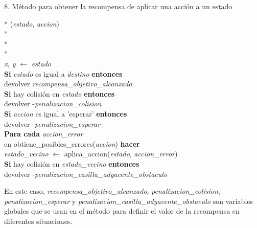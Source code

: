 \documentclass[conference,a4paper]{IEEEtran}
\begin{document}
8. Método para obtener la recompensa de aplicar una acción a un estado
  \begin{pseudo}*
    (\textit{estado}, \textit{accion}) \\*
     \\*
     \\*
     \\
    \textit{x, y} $\leftarrow$ \textit{estado} \\
    \textbf{Si} \textit{estado} es igual a \textit{destino} \textbf{entonces} \\
    \> devolver \textit{recompensa\_objetivo\_alcanzado} \\
    \textbf{Si} hay colisión en \textit{estado} \textbf{entonces} \\
    \> devolver -\textit{penalizacion\_colision} \\
    \textbf{Si} \textit{accion} es igual a 'esperar' \textbf{entonces} \\
    \> devolver -\textit{penalizacion\_esperar} \\
    \textbf{Para cada} \textit{accion\_error} \\ en obtiene\_posibles\_errores(\textit{accion}) \textbf{hacer} \\
    \> \textit{estado\_vecino} $\leftarrow$ aplica\_accion(\textit{estado}, \textit{accion\_error}) \\
    \> \textbf{Si} hay colisión en \textit{estado\_vecino} \textbf{entonces} \\
    \> \> devolver -\textit{penalizacion\_casilla\_adyacente\_obstaculo} \\
  \end{pseudo}

  \vspace{0.5cm} 
  En este caso, \textit{recompensa\_objetivo\_alcanzado}, \textit{penalizacion\_colision}, \textit{penalizacion\_esperar} y \textit{penalizacion\_casilla\_adyacente\_obstaculo}
son variables globales que se usan en el método para definir el valor de la recompensa en diferentes situaciones.\newline
\end{document}
